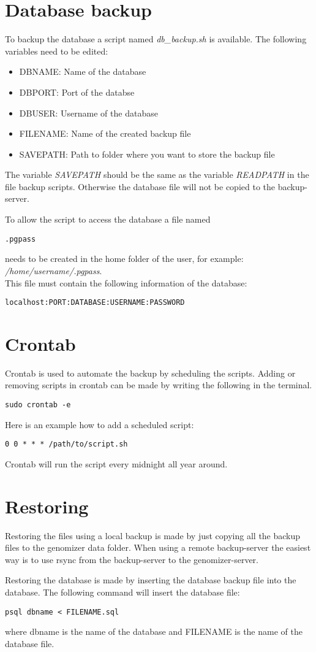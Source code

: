 \section{Database backup}
To backup the database a script named \emph{db\_backup.sh} is available. The following variables need to be edited:
\begin{itemize}
\item DBNAME: Name of the database
\item DBPORT: Port of the databse
\item DBUSER: Username of the database
\item FILENAME: Name of the created backup file
\item SAVEPATH: Path to folder where you want to store the backup file
\end{itemize}
The variable \emph{SAVEPATH} should be the same as the variable \emph{READPATH} in the file backup scripts. Otherwise the database file will not be copied to the backup-server.

To allow the script to access the database a file named 
\begin{verbatim}
.pgpass
\end{verbatim}
needs to be created in the home folder of the user, for example: \\
\emph{/home/username/.pgpass}. \\
This file must contain the following information of the database:
\begin{verbatim}
localhost:PORT:DATABASE:USERNAME:PASSWORD
\end{verbatim}

\section{Crontab}
Crontab is used to automate the backup by scheduling the scripts. Adding or removing scripts in crontab can be made by writing the following in the terminal.
\begin{verbatim}
sudo crontab -e
\end{verbatim}
Here is an example how to add a scheduled script:
\begin{verbatim}
0 0 * * * /path/to/script.sh
\end{verbatim}
Crontab will run the script every midnight all year around.

\section{Restoring}
Restoring the files using a local backup is made by just copying all the backup files to the genomizer data folder. When using a remote backup-server the easiest way is to use rsync from the backup-server to the genomizer-server.

Restoring the database is made by inserting the database backup file into the database. The following command will insert the database file:
\begin{verbatim}
psql dbname < FILENAME.sql
\end{verbatim}
where dbname is the name of the database and FILENAME is the name of the database file.

